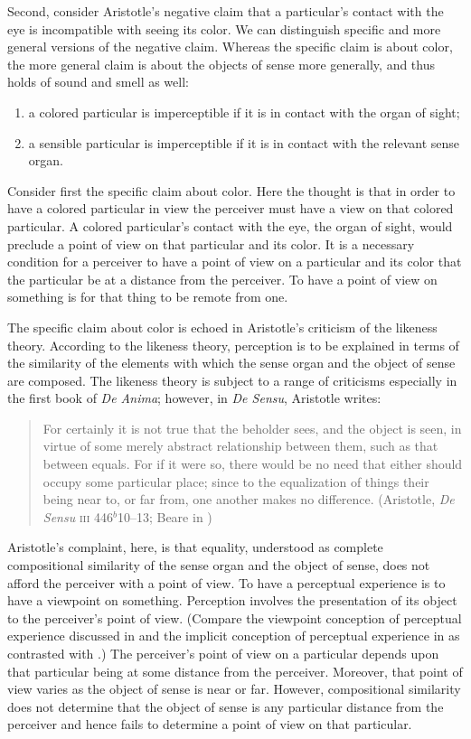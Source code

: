 Second, consider Aristotle's negative claim that a particular's contact with the eye is incompatible with seeing its color.  We can distinguish specific and more general versions of the negative claim. Whereas the specific claim is about color, the more general claim is about the objects of sense more generally, and thus holds of sound and smell as well:
\begin{enumerate}[(1)]
	\item a colored particular is imperceptible if it is in contact with the organ of sight;
	\item a sensible particular is imperceptible if it is in contact with the relevant sense organ.
\end{enumerate}

Consider first the specific claim about color. Here the thought is that in order to have a colored particular in view the perceiver must have a view on that colored particular. A colored particular's contact with the eye, the organ of sight, would preclude a point of view on that particular and its color. It is a necessary condition for a perceiver to have a point of view on a particular and its color that the particular be at a distance from the perceiver. To have a point of view on something is for that thing to be remote from one.

The specific claim about color is echoed in Aristotle's criticism of the likeness theory. According to the likeness theory, perception is to be explained in terms of the similarity of the elements with which the sense organ and the object of sense are composed. The likeness theory is subject to a range of criticisms especially in the first book of \emph{De Anima}; however, in \emph{De Sensu}, Aristotle writes:
\begin{quote}
	For certainly it is not true that the beholder sees, and the object is seen, in virtue of some merely abstract relationship between them, such as that between equals. For if it were so, there would be no need that either should occupy some particular place; since to the equalization of things their being near to, or far from, one another makes no difference. (Aristotle, \emph{De Sensu} \textsc{iii} 446\( ^{b} \)10--13; Beare in \citealt[20]{Barnes:1984uq})
\end{quote}
Aristotle's complaint, here, is that equality, understood as complete compositional similarity of the sense organ and the object of sense, does not afford the perceiver with a point of view. To have a perceptual experience is to have a viewpoint on something. Perception involves the presentation of its object to the perceiver's point of view. (Compare the viewpoint conception of perceptual experience discussed in \citealt{Martin:1998nx} and the implicit conception of perceptual experience in \citealt{Nagel:1979fk} as contrasted with \citealt{Jackson:1982my}.) The perceiver's point of view on a particular depends upon that particular being at some distance from the perceiver. Moreover, that point of view varies as the object of sense is near or far. However, compositional similarity does not determine that the object of sense is any particular distance from the perceiver and hence fails to determine a point of view on that particular.

